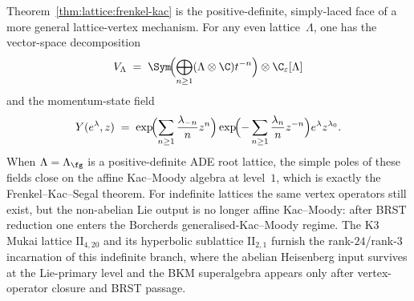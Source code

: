 \begin{remark}
\label{rem:lattice:mukai-borcherds-branch}
Theorem~\ref{thm:lattice:frenkel-kac} is the positive-definite,
simply-laced face of a more general lattice-vertex mechanism. For any
even lattice~$\Lambda$, one has the vector-space decomposition
\[
 V_\Lambda
 \;=\;
 \Sym\!\Bigl(\bigoplus_{n\ge 1}(\Lambda\otimes\C)t^{-n}\Bigr)
 \otimes \C_\varepsilon[\Lambda]
\]
and the momentum-state field
\[
 Y(e^\lambda,z)
 \;=\;
 \exp\!\Bigl(\sum_{n\ge 1}\frac{\lambda_{-n}}{n}z^n\Bigr)
 \exp\!\Bigl(-\sum_{n\ge 1}\frac{\lambda_n}{n}z^{-n}\Bigr)
 e^\lambda z^{\lambda_0}.
\]
When $\Lambda=\Lambda_\fg$ is a positive-definite ADE root lattice, the
simple poles of these fields close on the affine Kac--Moody algebra at
level~$1$, which is exactly the Frenkel--Kac--Segal theorem. For
indefinite lattices the same vertex operators still exist, but the
non-abelian Lie output is no longer affine Kac--Moody: after BRST
reduction one enters the Borcherds generalised-Kac--Moody regime. The
K3 Mukai lattice $\mathrm{II}_{4,20}$ and its hyperbolic sublattice
$\mathrm{II}_{2,1}$ furnish the rank-$24$/rank-$3$ incarnation of this
indefinite branch, where the abelian Heisenberg input survives at the
Lie-primary level and the BKM superalgebra appears only after
vertex-operator closure and BRST passage.
\end{remark}

